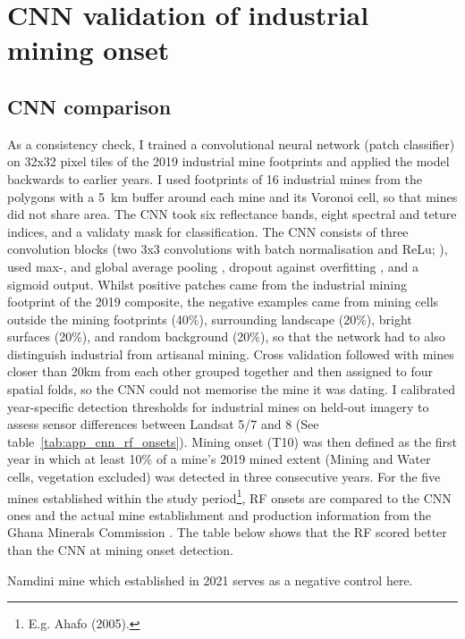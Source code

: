 \documentclass[]{interact}
\begin{document}
\section{CNN validation of industrial mining onset}
\label{app:cnn}
\subsection{CNN comparison}
As a consistency check, I trained a convolutional neural network (patch classifier)\citep{lecun1998Gradientbased} on 32x32 pixel tiles of the 2019 industrial mine footprints and applied the model backwards to earlier years. I used footprints of 16 industrial mines from the \citet{maus2022update} polygons with a 5~km buffer around each mine and its Voronoi cell, so that mines did not share area. The CNN took six reflectance bands, eight spectral and teture indices, and a validaty mask for classification. The CNN consists of three convolution blocks (two 3x3 convolutions with batch normalisation and ReLu; \citep{ioffe2015Batch}), used max-, and global average pooling \citep{lin2014Network}, dropout against overfitting \citep{srivastava2014Dropout}, and a sigmoid output. Whilst positive patches came from the industrial mining footprint of the 2019 composite, the negative examples came from mining cells outside the mining footprints (40\%), surrounding landscape (20\%), bright surfaces (20\%), and random background (20\%), so that the network had to also distinguish industrial from artisanal mining. Cross validation followed \citet{roberts2017Crossvalidation} with mines closer than 20km from each other grouped together and then assigned to four spatial folds, so the CNN could not memorise the mine it was dating. I calibrated year-specific detection thresholds for industrial mines on held-out imagery to assess sensor differences between Landsat 5/7 and 8 (See table~\ref{tab:app_cnn_rf_onsets}). Mining onset (T10) was then defined as the first year in which at least 10\% of a mine's 2019 mined extent (Mining and Water cells, vegetation excluded) was detected in three consecutive years. For the five mines established within the study period\footnote{E.g. Ahafo (2005).}, RF onsets are compared to the CNN ones and the actual mine establishment and production information from the Ghana Minerals Commission \citep{Industrystatistics}. The table below shows that the RF scored better than the CNN at mining onset detection.

Namdini mine which established in 2021 serves as a negative control here.
\end{document}
